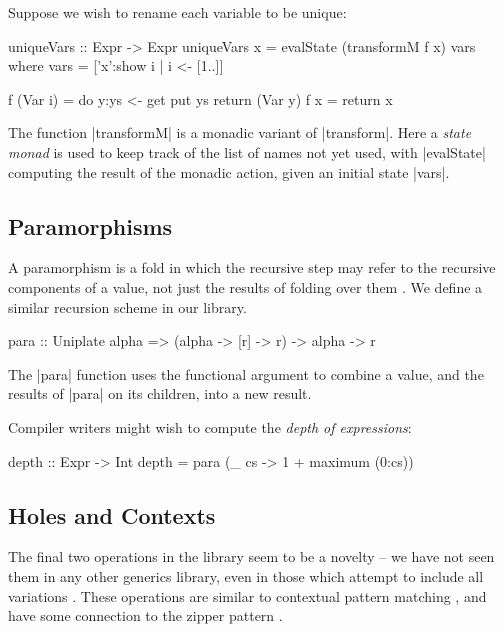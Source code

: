 \begin{example}
Suppose we wish to rename each variable to be unique:

\begin{code}
uniqueVars :: Expr -> Expr
uniqueVars x = evalState (transformM f x) vars
    where
        vars = ['x':show i | i <- [1..]]

        f (Var i)  = do  y:ys <- get
                         put ys
                         return (Var y)
        f x        = return x
\end{code}

The function |transformM| is a monadic variant of |transform|. Here a \textit{state monad} is used to keep track of the list of names not yet used, with |evalState| computing the result of the monadic action, given an initial state |vars|.
\end{example}

\subsection{Paramorphisms}

A paramorphism is a fold in which the recursive step may refer to the recursive components of a value, not just the results of folding over them \cite{meertens:paramorphisms}. We define a similar recursion scheme in our library.

\begin{code}
para :: Uniplate alpha => (alpha -> [r] -> r) -> alpha -> r
\end{code}

The |para| function uses the functional argument to combine a value, and the results of |para| on its children, into a new result.

\begin{example}
Compiler writers might wish to compute the \textit{depth of expressions}:

\begin{code}
depth :: Expr -> Int
depth = para (\_ cs -> 1 + maximum (0:cs))
\end{code}\codeexample
\end{example}

\subsection{Holes and Contexts}
\label{secU:holes_contexts}

The final two operations in the library seem to be a novelty -- we have not seen them in any other generics library, even in those which attempt to include all variations \citep{ren:generic_recursion_toolbox}. These operations are similar to contextual pattern matching \citep{mohnen:context_patterns}, and have some connection to the zipper pattern \cite{huet:zipper}.

